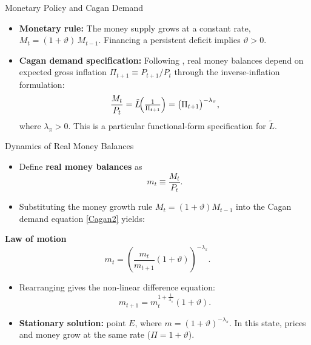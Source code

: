 \documentclass[11pt,aspectratio=169]{beamer}
\begin{document}
\begin{frame}{Monetary Policy and Cagan Demand}
\small
\begin{itemize}
    \item \textbf{Monetary rule:} The money supply grows at a constant rate,
    \(M_{t}=(1+\vartheta)\,M_{t-1}\). Financing a persistent deficit implies \(\vartheta>0\).

    \item \textbf{Cagan demand specification:} Following \textcite{cagan1956}, real money balances depend on expected gross inflation
    \(\Pi_{t+1}\equiv P_{t+1}/P_{t}\) through the inverse-inflation formulation:
    \begin{equation}
    \frac{M_{t}}{P_{t}}
    = \tilde{L}\!\Bigl(\tfrac{1}{\Pi_{t+1}}\Bigr)
    = \bigl(\Pi_{t+1}\bigr)^{-\lambda_{\pi}},
    \label{Cagan2}
    \end{equation}
    where \(\lambda_{\pi}>0\). This is a particular functional-form specification for \(\tilde{L}\).
\end{itemize}
\end{frame}



\begin{frame}{Dynamics of Real Money Balances}
\small

\begin{itemize}
    \item Define \textbf{real money balances} as
    \[
        m_t \equiv \frac{M_t}{P_t}.
    \]
    \item Substituting the money growth rule \(M_t=(1+\vartheta)M_{t-1}\) into the Cagan demand equation \eqref{Cagan2} yields:
\end{itemize}

\vspace{0.2cm}
\textbf{Law of motion}
\begin{equation*}
m_{t}=\left( \frac{m_{t}}{m_{t+1}}(1+\vartheta )\right) ^{-\lambda _{\pi }} .
\end{equation*}

\begin{itemize}
    \item Rearranging gives the non-linear difference equation:
    \begin{equation}
    m_{t+1}=m_{t}^{1+\frac{1}{\lambda _{\pi }}}(1+\vartheta ).
    \label{eq: RMB}
    \end{equation}

    \item \textbf{Stationary solution:} point \(E\), where \(m=(1+\vartheta)^{-\lambda_{\pi}}\). In this state, prices and money grow at the same rate (\(\Pi=1+\vartheta\)).
\end{itemize}

\end{frame}
\end{document}
